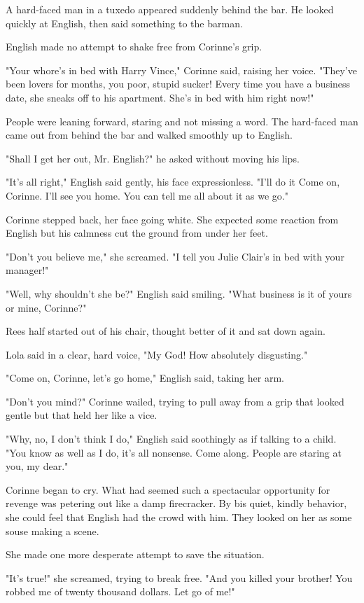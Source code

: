 \documentclass{novel}
\begin{document}
A hard-faced man in a tuxedo appeared suddenly behind the bar. He looked quickly at English, then said something to the barman.

English made no attempt to shake free from Corinne's grip.

"Your whore's in bed with Harry Vince," Corinne said, raising her voice. "They've been lovers for months, you poor, stupid sucker! Every time you have a business date, she sneaks off to his apartment. She's in bed with him right now!"

People were leaning forward, staring and not missing a word. The hard-faced man came out from behind the bar and walked smoothly up to English.

"Shall I get her out, Mr. English?" he asked without moving his lips.

"It's all right," English said gently, his face expressionless. "I'll do it Come on, Corinne. I'll see you home. You can tell me all about it as we go."

Corinne stepped back, her face going white. She expected some reaction from English but his calmness cut the ground from under her feet.

"Don't you believe me," she screamed. "I tell you Julie Clair's in bed with your manager!"

"Well, why shouldn't she be?" English said smiling. "What business is it of yours or mine, Corinne?"

Rees half started out of his chair, thought better of it and sat down again.

Lola said in a clear, hard voice, "My God! How absolutely disgusting."

"Come on, Corinne, let's go home," English said, taking her arm.

"Don't you mind?" Corinne wailed, trying to pull away from a grip that looked gentle but that held her like a vice.

"Why, no, I don't think I do," English said soothingly as if talking to a child. "You know as well as I do, it's all nonsense. Come along. People are staring at you, my dear."

Corinne began to cry. What had seemed such a spectacular opportunity for revenge was petering out like a damp firecracker. By bis quiet, kindly behavior, she could feel that English had the crowd with him. They looked on her as some souse making a scene.

She made one more desperate attempt to save the situation.

"It's true!" she screamed, trying to break free. "And you killed your brother! You robbed me of twenty thousand dollars. Let go of me!"
\end{document}
